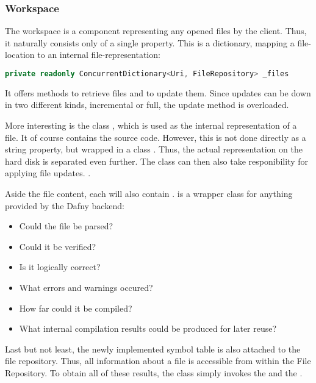 \subsubsection{Workspace}
The workspace is a component representing any opened files by the client.
Thus, it naturally consists only of a single property.
This is a dictionary, mapping a file-location to an internal file-representation:

\begin{lstlisting}[language=csharp, caption={Workspace Property}, captionpos=b, label={lst:workspaceproperty}]
private readonly ConcurrentDictionary<Uri, FileRepository> _files
\end{lstlisting}

It offers methods to retrieve files and to update them.
Since updates can be down in two different kinds, incremental or full, the update method is overloaded.

More interesting is the class , which is used as the internal representation of a file.
It of course contains the source code.
However, this is not done directly as a string property, but wrapped in a class .
Thus, the actual representation on the hard disk is separated even further.
The  class can then also take responibility for applying file updates.
.

Aside the file content, each  will also contain .
 is a wrapper class for anything provided by the Dafny backend:
\begin{itemize}
    \item Could the file be parsed?
    \item Could it be verified?
    \item Is it logically correct?
    \item What errors and warnings occured?
    \item How far could it be compiled?
    \item What internal compilation results could be produced for later reuse?
\end{itemize}

Last but not least, the newly implemented symbol table is also attached to the file repository.
Thus, all information about a file is accessible from within the File Repository.
To obtain all of these results, the class simply invokes the  and the .

